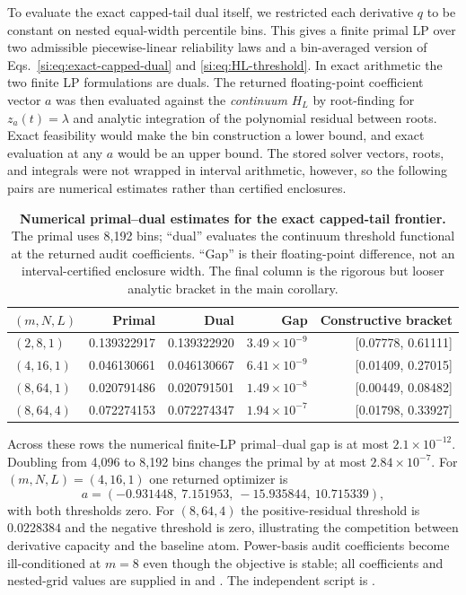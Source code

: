 \documentclass[10pt,twocolumn]{article}
\begin{document}
To evaluate the exact capped-tail dual itself, we restricted each derivative
$q$ to be constant on nested equal-width percentile bins. This gives a finite
primal LP over two admissible piecewise-linear reliability laws and a
bin-averaged version of Eqs.~\ref{si:eq:exact-capped-dual} and
\ref{si:eq:HL-threshold}. In exact arithmetic the two finite LP formulations
are duals. The returned floating-point coefficient vector $a$ was then
evaluated against the \emph{continuum}
$H_L$ by root-finding for $z_a(t)=\lambda$ and analytic integration of the
polynomial residual between roots. Exact feasibility would make the bin
construction a lower bound, and exact evaluation at any $a$ would be an upper
bound. The stored solver vectors, roots, and integrals were not wrapped in
interval arithmetic, however, so the following pairs are numerical estimates
rather than certified enclosures.

\begin{table}[h]
\centering
\caption{\textbf{Numerical primal--dual estimates for the exact capped-tail frontier.} The primal uses 8,192 bins; ``dual'' evaluates the continuum threshold functional at the returned audit coefficients. ``Gap'' is their floating-point difference, not an interval-certified enclosure width. The final column is the rigorous but looser analytic bracket in the main corollary.}
\label{si:tab:capped-dual-checks}
\begin{tabular}{lrrrr}
\toprule
$(m,N,L)$ & Primal & Dual & Gap & Constructive bracket \\
\midrule
$(2,8,1)$  & 0.139322917 & 0.139322920 & $3.49\times10^{-9}$ & [0.07778, 0.61111] \\
$(4,16,1)$ & 0.046130661 & 0.046130667 & $6.41\times10^{-9}$ & [0.01409, 0.27015] \\
$(8,64,1)$ & 0.020791486 & 0.020791501 & $1.49\times10^{-8}$ & [0.00449, 0.08482] \\
$(8,64,4)$ & 0.072274153 & 0.072274347 & $1.94\times10^{-7}$ & [0.01798, 0.33927] \\
\bottomrule
\end{tabular}
\end{table}

Across these rows the numerical finite-LP primal--dual gap is at most
$2.1\times10^{-12}$. Doubling from 4,096 to 8,192 bins changes the primal by
at most $2.84\times10^{-7}$. For $(m,N,L)=(4,16,1)$ one returned optimizer is
\[
a=(-0.931448,\ 7.151953,\ -15.935844,\ 10.715339),
\]
with both thresholds zero. For
$(8,64,4)$ the positive-residual threshold is $0.0228384$ and the negative
threshold is zero, illustrating the competition between derivative capacity
and the baseline atom. Power-basis audit coefficients become ill-conditioned
at $m=8$ even though the objective is stable; all coefficients and nested-grid
values are supplied in
 and
. The independent script is
.
\end{document}
